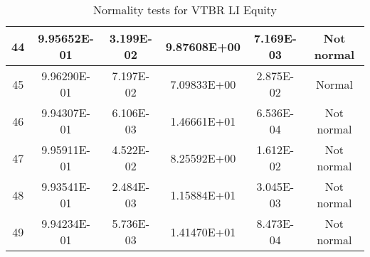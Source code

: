 \begin{table}[h]
\begin{tabular}{|c|c|c|c|c|c|}
		44 & 9.95652E-01 & 3.199E-02 & 9.87608E+00 & 7.169E-03 & Not normal\\\hline
		45 & 9.96290E-01 & 7.197E-02 & 7.09833E+00 & 2.875E-02 & Normal\\\hline
		46 & 9.94307E-01 & 6.106E-03 & 1.46661E+01 & 6.536E-04 & Not normal\\\hline
		47 & 9.95911E-01 & 4.522E-02 & 8.25592E+00 & 1.612E-02 & Not normal\\\hline
		48 & 9.93541E-01 & 2.484E-03 & 1.15884E+01 & 3.045E-03 & Not normal\\\hline
		49 & 9.94234E-01 & 5.736E-03 & 1.41470E+01 & 8.473E-04 & Not normal\\\hline
	\end{tabular}
	\caption{Normality tests for VTBR LI Equity}
	\label{tab:normality_tests_VTBR_LI}
\end{table}
